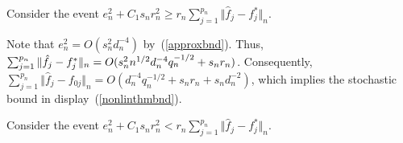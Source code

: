 \documentclass[aos,MSNbibl,dvips]{arximspdf}
\newcommand{\rrVert}{\Vert}
\newcommand{\llVert}{\Vert}
\begin{document}
\begin{appendix}
\begin{longlist}
\item[\textit{Case} (i).]
Consider the event $e_n^2+C_1s_nr_n^2\ge r_n\sum_{j=1}^{p_n} \llVert
\hat f_j-f_j^*\rrVert _n$.

Note that $e_n^2=O(s_n^2d_n^{-4})$ by~(\ref{approxbnd}).
Thus, $\sum_{j=1}^{p_n} \llVert \hat f_j-f_j^*\rrVert _n =
O(s_n^2n^{1/2}d_n^{-4}\*q_n^{-1/2}+s_nr_n)$. Consequently,
$\sum_{j=1}^{p_n} \llVert \hat f_j-f_{0j}\rrVert
_n=O(d_n^{-4}q_n^{-1/2}+s_nr_n+s_nd_n^{-2})$, which implies the
stochastic bound in display~(\ref{nonlinthmbnd}).\vspace*{1pt}

\item[\textit{Case} (ii).]
Consider the event $e_n^2+C_1s_nr_n^2< r_n\sum_{j=1}^{p_n} \llVert
\hat f_j-f_j^*\rrVert _n$.\vadjust{\goodbreak}


\end{longlist}
\end{appendix}
\end{document}
